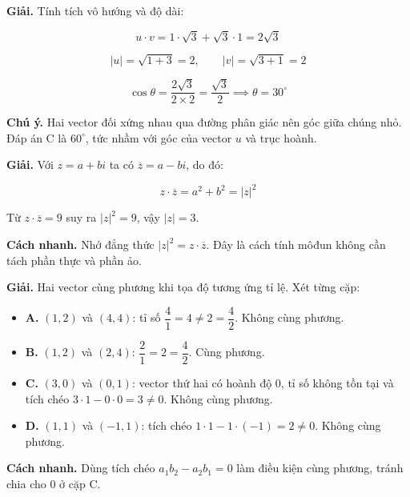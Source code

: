 \documentclass[11pt, a4paper]{article}
\begin{document}
\begin{dapan}[15 — Đáp án A]
\textbf{Giải.} Tính tích vô hướng và độ dài:

$$u \cdot v = 1 \cdot \sqrt{3} + \sqrt{3} \cdot 1 = 2\sqrt{3}$$

$$\lvert u \rvert = \sqrt{1 + 3} = 2, \qquad \lvert v \rvert = \sqrt{3 + 1} = 2$$

$$\cos\theta = \frac{2\sqrt{3}}{2 \times 2} = \frac{\sqrt{3}}{2} \implies \theta = 30^\circ$$

\textbf{Chú ý.} Hai vector đối xứng nhau qua đường phân giác nên góc giữa chúng nhỏ. Đáp án C là $60^\circ$, tức nhầm với góc của vector $u$ và trục hoành.
\end{dapan}

\begin{dapan}[16 — Đáp án C]
\textbf{Giải.} Với $z = a + bi$ ta có $\overline{z} = a - bi$, do đó:

$$z \cdot \overline{z} = a^2 + b^2 = \lvert z \rvert^2$$

Từ $z \cdot \overline{z} = 9$ suy ra $\lvert z \rvert^2 = 9$, vậy $\lvert z \rvert = 3$.

\textbf{Cách nhanh.} Nhớ đẳng thức $\lvert z \rvert^2 = z \cdot \overline{z}$. Đây là cách tính môđun không cần tách phần thực và phần ảo.
\end{dapan}

\begin{dapan}[17 — Đáp án B]
\textbf{Giải.} Hai vector cùng phương khi tọa độ tương ứng tỉ lệ. Xét từng cặp:

\begin{itemize}[leftmargin=1.4em, itemsep=2pt]
\item \textbf{A.} $(1,2)$ và $(4,4)$: tỉ số $\dfrac{4}{1} = 4 \neq 2 = \dfrac{4}{2}$. Không cùng phương.
\item \textbf{B.} $(1,2)$ và $(2,4)$: $\dfrac{2}{1} = 2 = \dfrac{4}{2}$. Cùng phương.
\item \textbf{C.} $(3,0)$ và $(0,1)$: vector thứ hai có hoành độ $0$, tỉ số không tồn tại và tích chéo $3 \cdot 1 - 0 \cdot 0 = 3 \neq 0$. Không cùng phương.
\item \textbf{D.} $(1,1)$ và $(-1,1)$: tích chéo $1 \cdot 1 - 1 \cdot (-1) = 2 \neq 0$. Không cùng phương.
\end{itemize}


\textbf{Cách nhanh.} Dùng tích chéo $a_1 b_2 - a_2 b_1 = 0$ làm điều kiện cùng phương, tránh chia cho $0$ ở cặp C.
\end{dapan}
\end{document}
